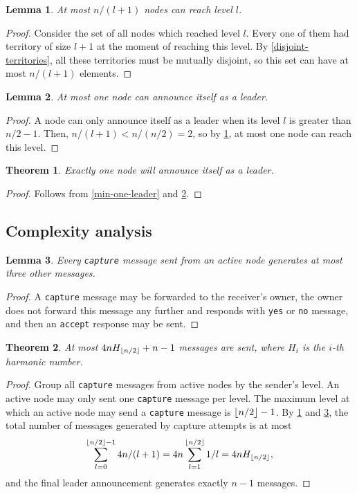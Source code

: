 \documentclass[a4paper,12pt]{article}
\newtheorem{lemma}{Lemma}
\newtheorem{theorem}{Theorem}
\DeclarePairedDelimiter{\floor}{\lfloor}{\rfloor}
\newcommand{\tcapture}{\texttt{capture}\xspace}
\newcommand{\taccept}{\texttt{accept}\xspace}
\newcommand{\tyes}{\texttt{yes}\xspace}
\newcommand{\tno}{\texttt{no}\xspace}
\begin{document}
\begin{lemma}\label{max-for-level}
    At most $n / (l + 1)$ nodes can reach level $l$.
\end{lemma}
\begin{proof}
    Consider the set of all nodes which reached level $l$.
    Every one of them had territory of size $l + 1$ at the moment of reaching this level.
    By \cref{disjoint-territories}, all these territories must be mutually disjoint,
    so this set can have at most $n / (l + 1)$ elements.
\end{proof}

\begin{lemma}\label{max-one-leader}
    At most one node can announce itself as a leader.
\end{lemma}
\begin{proof}
    A node can only announce itself as a leader when its level $l$ is greater than $n / 2 - 1$.
    Then, $n / (l + 1) < n / (n / 2) = 2$, so by \cref{max-for-level}, at most one node can reach this level.
\end{proof}

\begin{theorem}\label{one-leader}
    Exactly one node will announce itself as a leader.
\end{theorem}
\begin{proof}
    Follows from \cref{min-one-leader} and \cref{max-one-leader}.
\end{proof}

\subsection*{Complexity analysis}

\begin{lemma}\label{capture-messages}
    Every \tcapture message sent from an active node generates at most three other messages.
\end{lemma}
\begin{proof}
    A \tcapture message may be forwarded to the receiver's owner,
    the owner does not forward this message any further and responds with \tyes or \tno message,
    and then an \taccept response may be sent.
\end{proof}

\begin{theorem}\label{messages}
    At most $4 n H_{\floor{n / 2}} + n - 1$ messages are sent,
    where $H_i$ is the $i$-th harmonic number.
\end{theorem}
\begin{proof}
    Group all \tcapture messages from active nodes by the sender's level.
    An active node may only sent one \tcapture message per level.
    The maximum level at which an active node may send a \tcapture message is $\floor{n / 2} - 1$.
    By \cref{max-for-level} and \cref{capture-messages},
    the total number of messages generated by capture attempts is at most
    $$\sum_{l=0}^{\floor{n / 2} - 1} 4 n / (l + 1) = 4 n \sum_{l=1}^{\floor{n / 2}} 1 / l = 4 n H_{\floor{n / 2}},$$
    and the final leader announcement generates exactly $n - 1$ messages.
\end{proof}
\end{document}
